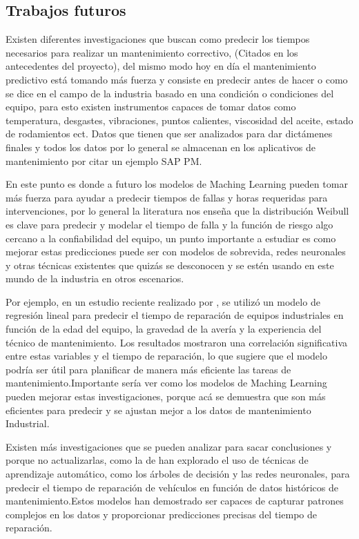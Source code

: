 \documentclass[
  11pt,
  bookmarksnumbered]{article}
\begin{document}
\hypertarget{trabajos-futuros}{%
\subsection{Trabajos futuros}\label{trabajos-futuros}}

Existen diferentes investigaciones que buscan como predecir los tiempos necesarios para realizar un mantenimiento correctivo, (Citados en los antecedentes del proyecto), del mismo modo hoy en día el mantenimiento predictivo está tomando más fuerza y consiste en predecir antes de hacer o como se dice en el campo de la industria basado en una condición o condiciones del equipo, para esto existen instrumentos capaces de tomar datos como temperatura, desgastes, vibraciones, puntos calientes, viscosidad del aceite, estado de rodamientos ect. Datos que tienen que ser analizados para dar dictámenes finales y todos los datos por lo general se almacenan en los aplicativos de mantenimiento por citar un ejemplo SAP PM.

En este punto es donde a futuro los modelos de Maching Learning pueden tomar más fuerza para ayudar a predecir tiempos de fallas y horas requeridas para intervenciones, por lo general la literatura nos enseña que la distribución Weibull es clave para predecir y modelar el tiempo de falla y la función de riesgo algo cercano a la confiabilidad del equipo, un punto importante a estudiar es como mejorar estas predicciones puede ser con modelos de sobrevida, redes neuronales y otras técnicas existentes que quizás se desconocen y se estén usando en este mundo de la industria en otros escenarios.

Por ejemplo, en un estudio reciente realizado por \textcite{smith2020predicting}, se utilizó un modelo de regresión lineal para predecir el tiempo de reparación de equipos industriales en función de la edad del equipo, la gravedad de la avería y la experiencia del técnico de mantenimiento.
Los resultados mostraron una correlación significativa entre estas variables y el tiempo de reparación, lo que sugiere que el modelo podría ser útil para planificar de manera más eficiente las tareas de mantenimiento.Importante sería ver como los modelos de Maching Learning pueden mejorar estas investigaciones, porque acá se demuestra que son más eficientes para predecir y se ajustan mejor a los datos de mantenimiento Industrial.

Existen más investigaciones que se pueden analizar para sacar conclusiones y porque no actualizarlas, como la de \textcite{liu2019predicting} han explorado el uso de técnicas de aprendizaje automático, como los árboles de decisión y las redes neuronales, para predecir el tiempo de reparación de vehículos en función de datos históricos de mantenimiento.Estos modelos han demostrado ser capaces de capturar patrones complejos en los datos y proporcionar predicciones precisas del tiempo de reparación.
\end{document}
